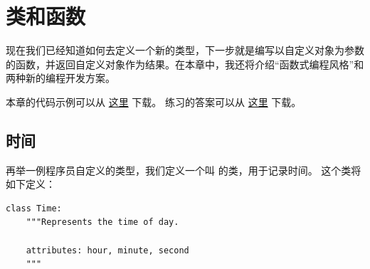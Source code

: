 

\chapter{类和函数}
\label{time}


现在我们已经知道如何去定义一个新的类型，下一步就是编写以自定义对象为参数的函数，并返回自定义对象作为结果。在本章中，我还将介绍“函数式编程风格”和两种新的编程开发方案。


本章的代码示例可以从 \href{http://thinkpython2.com/code/Time1.py}{这里} 下载。  练习的答案可以从 \href{http://thinkpython2.com/code/Time1_soln.py}{这里} 下载。

\section{时间}
\label{isafter}


再举一例程序员自定义的类型，我们定义一个叫  的类，用于记录时间。
这个类将如下定义：
  

\begin{lstlisting}
class Time:
    """Represents the time of day.

    attributes: hour, minute, second
    """
\end{lstlisting}

%

